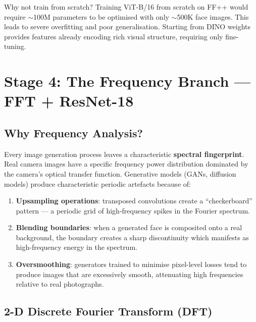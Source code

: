 \documentclass[12pt,a4paper]{article}
\begin{document}
\begin{insightbox}{Why not train from scratch?}
Training ViT-B/16 from scratch on FF++ would require $\sim$100M parameters to be
optimised with only $\sim$500K face images. This leads to severe overfitting and poor
generalisation. Starting from DINO weights provides features already encoding rich visual
structure, requiring only fine-tuning.
\end{insightbox}

\newpage

\section{Stage 4: The Frequency Branch --- FFT + ResNet-18}

\subsection{Why Frequency Analysis?}

Every image generation process leaves a characteristic \textbf{spectral fingerprint}.
Real camera images have a specific frequency power distribution dominated by the camera's
optical transfer function. Generative models (GANs, diffusion models) produce characteristic
periodic artefacts because of:

\begin{enumerate}[leftmargin=1.5em]
  \item \textbf{Upsampling operations}: transposed convolutions create a ``checkerboard''
    pattern --- a periodic grid of high-frequency spikes in the Fourier spectrum.
  \item \textbf{Blending boundaries}: when a generated face is composited onto a real
    background, the boundary creates a sharp discontinuity which manifests as high-frequency
    energy in the spectrum.
  \item \textbf{Oversmoothing}: generators trained to minimise pixel-level losses tend to
    produce images that are excessively smooth, attenuating high frequencies relative to
    real photographs.
\end{enumerate}

\subsection{2-D Discrete Fourier Transform (DFT)}
\end{document}
